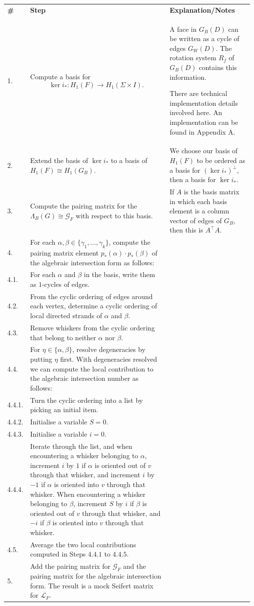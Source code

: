 \documentclass[12pt]{report}
\theoremstyle{upright}
\begin{document}
{\def\arraystretch{1.6}
\begin{longtable}{p{}p{}p{}}
	\textbf{\#} & \textbf{Step}
	& \textbf{Explanation/Notes}\\
	1.
	& Compute a basis for \[\ker i_{*}: H_{1}(F) \to H_{1}(\Sigma \times I).\]
	& A face in $G_{B}(D)$ can be written as a cycle of edges $G_{W}(D)$. The rotation system $R_{f}$ of $G_{B}(D)$ contains this information.
	
	There are technical implementation details involved here. An implementation can be found in Appendix A.\\
	2.
	& Extend the basis of $\ker i_{*}$ to a basis of ${H_{1}(F) \cong H_{1}(G_{B})}$.
	& We choose our basis of $H_{1}(F)$ to be ordered as a basis for $(\ker i_{*})^{\perp}$, then a basis for $\ker i_{*}$.\\
	3.
	& Compute the pairing matrix for the $\Lambda_{B}(G) \cong \mathcal{G}_{F}$ with respect to this basis.
	& If $A$ is the basis matrix in which each basis element is a column vector of edges of $G_{B}$, then this is $A^{\top}A$.\\
	4.
	& For each $\alpha, \beta \in \{\gamma_{1}, \dots, \gamma_{k}\}$, compute the pairing matrix element $p_{*}(\alpha) \cdot p_{*}(\beta)$ of the algebraic intersection form as follows:
	& \\
	4.1. 
	& For each $\alpha$ and $\beta$ in the basis, write them as $1$-cycles of edges.
	& \\
	4.2.
	& From the cyclic ordering of edges around each vertex, determine a cyclic ordering of local directed strands of $\alpha$ and $\beta$.
	& \\
	4.3.
	& Remove whiskers from the cyclic ordering that belong to neither $\alpha$ nor $\beta$.
	& \\
	4.4. 
	& For $\eta \in \{\alpha, \beta\}$, resolve degeneracies by putting $\eta$ first. With degeneracies resolved we can compute the local contribution to the algebraic intersection number as follows:
	& \\
	4.4.1.
	& Turn the cyclic ordering into a list by picking an initial item.
	& \\
	4.4.2.
	& Initialise a variable $S = 0$.
	& \\
	4.4.3.
	& Initialise a variable $i = 0$.
	& \\
	4.4.4.
	& Iterate through the list, and when encountering a whisker belonging to $\alpha$, increment $i$ by $1$ if $\alpha$ is oriented out of $v$ through that whisker, and increment $i$ by $-1$ if $\alpha$ is oriented into $v$ through that whisker. When encountering a whisker belonging to $\beta$, increment $S$ by $i$ if $\beta$ is oriented out of $v$ through that whisker, and $-i$ if $\beta$ is oriented into $v$ through that whisker.
	& \\
	4.5.
	& Average the two local contributions computed in Steps $4.4.1$ to $4.4.5$.
	& \\
	5.
	& Add the pairing matrix for $\mathcal{G}_{F}$ and the pairing matrix for the algebraic intersection form. The result is a mock Seifert matrix for $\mathcal{L}_{F}$.
\end{longtable}
}
\end{document}
